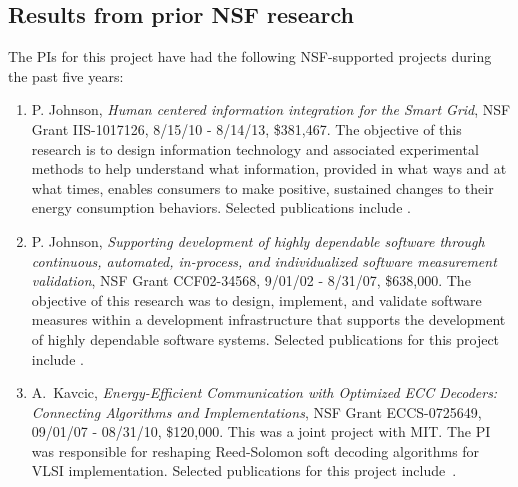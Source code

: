 
\subsection{Results from prior NSF research}

The PIs for this project have had the following NSF-supported projects during the past five years:

\begin{enumerate}
\item P. Johnson, {\em Human centered information integration for the Smart Grid}, NSF
  Grant IIS-1017126, 8/15/10 - 8/14/13, \$381,467. The objective of this
  research is to design information technology and associated experimental
  methods to help understand what information, provided in what ways and at
  what times, enables consumers to make positive, sustained changes to
  their energy consumption behaviors. Selected publications include
  \cite{csdl2-10-05,csdl2-10-07,csdl2-11-02,csdl2-11-03,csdl2-11-07}.

\item P. Johnson, {\em Supporting development of highly dependable software through
    continuous, automated, in-process, and individualized software
    measurement validation}, NSF Grant CCF02-34568, 9/01/02 - 8/31/07,
  \$638,000.  The objective of this research was to design, implement, and
  validate software measures within a development infrastructure that
  supports the development of highly dependable software systems.  Selected
  publications for this project include
  \cite{csdl2-04-22,csdl2-04-13,csdl2-04-11,csdl2-03-12,csdl2-02-07,csdl2-03-07,csdl2-04-02,csdl2-04-04,csdl2-04-11,csdl2-06-07,csdl2-06-08,csdl2-06-13,csdl2-06-06,csdl2-09-01}.

\item A.~Kavcic, {\em Energy-Efficient Communication with Optimized ECC Decoders:
    Connecting Algorithms and Implementations}, NSF Grant ECCS-0725649, 09/01/07 -
  08/31/10, \$120,000. This was a joint project with MIT. The PI was
  responsible for reshaping Reed-Solomon soft decoding algorithms for VLSI
  implementation. Selected
  publications for this project include~\cite{Bellorado10a,Bellorado10b,Lim08,Lim08a,Lim10,Lim10a}.


\end{enumerate}
